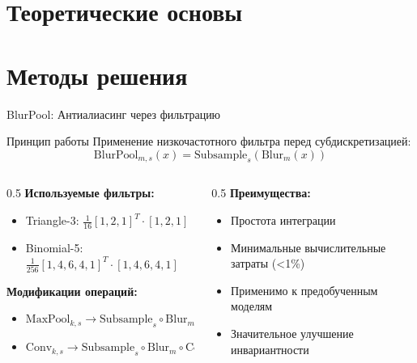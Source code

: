 \documentclass[aspectratio=169]{beamer}
\begin{document}
\section{Теоретические основы}

\section{Методы решения}

\begin{frame}{BlurPool: Антиалиасинг через фильтрацию}
    \begin{block}{Принцип работы}
        Применение низкочастотного фильтра перед субдискретизацией:
        $$\text{BlurPool}_{m,s}(x) = \text{Subsample}_{s}(\text{Blur}_{m}(x))$$
    \end{block}
    
    \begin{columns}
        \begin{column}{0.5\textwidth}
            \textbf{Используемые фильтры:}
            \begin{itemize}
                \item Triangle-3: $\frac{1}{16}[1, 2, 1]^T \cdot [1, 2, 1]$
                \item Binomial-5: $\frac{1}{256}[1, 4, 6, 4, 1]^T \cdot [1, 4, 6, 4, 1]$
            \end{itemize}
            
            \textbf{Модификации операций:}
            \begin{itemize}
                \item $\text{MaxPool}_{k,s} \rightarrow \text{Subsample}_{s} \circ \text{Blur}_{m} \circ \text{Max}_{k,1}$
                \item $\text{Conv}_{k,s} \rightarrow \text{Subsample}_{s} \circ \text{Blur}_{m} \circ \text{Conv}_{k,1}$
            \end{itemize}
        \end{column}
        \begin{column}{0.5\textwidth}
            \textbf{Преимущества:}
            \begin{itemize}
                \item Простота интеграции
                \item Минимальные вычислительные затраты (<1\%)
                \item Применимо к предобученным моделям
                \item Значительное улучшение инвариантности
            \end{itemize}
        \end{column}
    \end{columns}
\end{frame}
\end{document}
